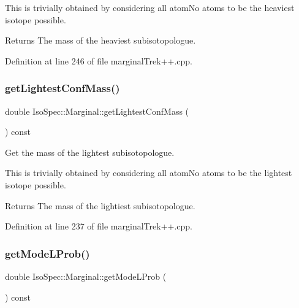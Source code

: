 This is trivially obtained by considering all atom\+No atoms to be the heaviest isotope possible. \begin{DoxyReturn}{Returns}
The mass of the heaviest subisotopologue. 
\end{DoxyReturn}


Definition at line 246 of file marginal\+Trek++.\+cpp.

\mbox{\label{class_iso_spec_1_1_marginal_a8b67c507263973da53e533d804e23ac9}} 
\subsubsection{\texorpdfstring{get\+Lightest\+Conf\+Mass()}{getLightestConfMass()}}
{\footnotesize\ttfamily double Iso\+Spec\+::\+Marginal\+::get\+Lightest\+Conf\+Mass (\begin{DoxyParamCaption}{ }\end{DoxyParamCaption}) const}



Get the mass of the lightest subisotopologue. 

This is trivially obtained by considering all atom\+No atoms to be the lightest isotope possible. \begin{DoxyReturn}{Returns}
The mass of the lightiest subisotopologue. 
\end{DoxyReturn}


Definition at line 237 of file marginal\+Trek++.\+cpp.

\mbox{\label{class_iso_spec_1_1_marginal_ac9408957145d2aa63af32f6647c8ea49}} 
\subsubsection{\texorpdfstring{get\+Mode\+L\+Prob()}{getModeLProb()}}
{\footnotesize\ttfamily double Iso\+Spec\+::\+Marginal\+::get\+Mode\+L\+Prob (\begin{DoxyParamCaption}{ }\end{DoxyParamCaption}) const\hspace{0.3cm}{\ttfamily [inline]}}



